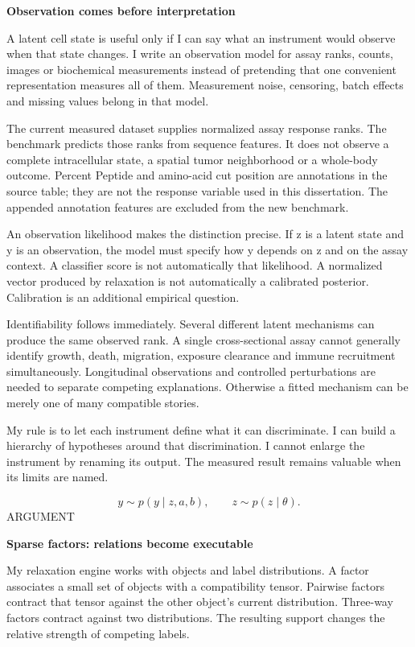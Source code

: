 \documentclass[10pt]{article}
\begin{document}
{\LARGE\bfseries\color{ink}Observation comes before interpretation}\par\vspace{5pt}
A latent cell state is useful only if I can say what an instrument would observe when that state changes. I write an observation model for assay ranks, counts, images or biochemical measurements instead of pretending that one convenient representation measures all of them. Measurement noise, censoring, batch effects and missing values belong in that model.\par
The current measured dataset supplies normalized assay response ranks. The benchmark predicts those ranks from sequence features. It does not observe a complete intracellular state, a spatial tumor neighborhood or a whole-body outcome. Percent Peptide and amino-acid cut position are annotations in the source table; they are not the response variable used in this dissertation. The appended annotation features are excluded from the new benchmark.\par
An observation likelihood makes the distinction precise. If z is a latent state and y is an observation, the model must specify how y depends on z and on the assay context. A classifier score is not automatically that likelihood. A normalized vector produced by relaxation is not automatically a calibrated posterior. Calibration is an additional empirical question.\par
Identifiability follows immediately. Several different latent mechanisms can produce the same observed rank. A single cross-sectional assay cannot generally identify growth, death, migration, exposure clearance and immune recruitment simultaneously. Longitudinal observations and controlled perturbations are needed to separate competing explanations. Otherwise a fitted mechanism can be merely one of many compatible stories.\par
My rule is to let each instrument define what it can discriminate. I can build a hierarchy of hypotheses around that discrimination. I cannot enlarge the instrument by renaming its output. The measured result remains valuable when its limits are named.\par
\[y \sim p(y\mid z, a, b),\qquad z\sim p(z\mid \theta).\]
\clearpage
\hypertarget{p8}{}
{\small\color{accent}\MakeUppercase{Argument}}\par
{\LARGE\bfseries\color{ink}Sparse factors: relations become executable}\par\vspace{5pt}
My relaxation engine works with objects and label distributions. A factor associates a small set of objects with a compatibility tensor. Pairwise factors contract that tensor against the other object's current distribution. Three-way factors contract against two distributions. The resulting support changes the relative strength of competing labels.\par
\end{document}
